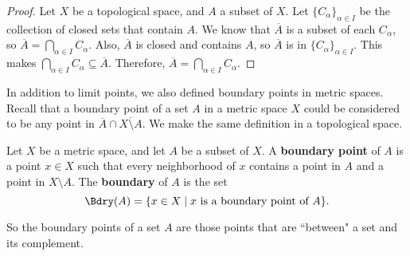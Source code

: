 \begin{proof} Let $X$ be a topological space, and $A$ a subset of $X$. Let $\{C_{\alpha}\}_{\alpha \in I}$ be the collection of closed sets that contain $A$. We know that $\overline{A}$ is a subset of each $C_{\alpha}$, so $\overline{A} = \bigcap_{\alpha \in I} C_{\alpha}$. Also, $\overline{A}$ is closed and contains $A$, so $\overline{A}$ is in $\{C_{\alpha}\}_{\alpha \in I}$. This makes $\bigcap_{\alpha \in I} C_{\alpha} \subseteq \overline{A}$. Therefore, $\overline{A} = \bigcap_{\alpha \in I} C_{\alpha}$. 
\end{proof} 



\label{sec_boundary_set}

In addition to limit points, we also defined boundary points in metric spaces. Recall that a boundary point of a set $A$ in a metric space $X$ could be considered to be any point in $\overline{A} \cap \overline{X \setminus A}$. We make the same definition in a topological space. 



\begin{definition} Let $X$ be a metric space, and let $A$ be a subset of $X$. A \textbf{boundary point} of $A$ is a point $x \in X$ such that every neighborhood of $x$ contains a point in $A$ and a point in $X \setminus A$. The \textbf{boundary} of $A$ is the set 
\[\Bdry(A) = \{x \in X \mid x \text{ is a boundary point of } A\}.\]
\end{definition}



So the boundary points of a set $A$ are those points that are ``between" a set and its complement. 



